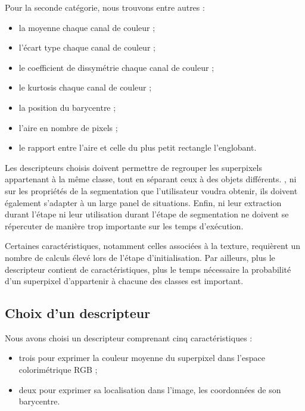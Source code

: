 Pour la seconde catégorie, nous trouvons\modif{,} entre autres :
\begin{itemize}
\item la moyenne  chaque canal de couleur  ; 
\item l'écart type  chaque canal de couleur  ;
\item le coefficient de dissymétrie   chaque canal de couleur ; 
\item le kurtosis  chaque canal de couleur  ; 
\item la position du barycentre ;
\item l'aire en nombre de pixels ;
\item le rapport entre l'aire  et celle du plus petit rectangle l'englobant. 
\end{itemize}

Les descripteurs choisis doivent permettre de regrouper les superpixels appartenant à la même classe, tout en séparant ceux  à des objets différents. , ni sur les propriétés de la segmentation que l'utilisateur voudra obtenir, ils doivent également s'adapter à un large panel de situations. Enfin, ni leur extraction durant l'étape ni leur utilisation durant l'étape de segmentation ne doivent se répercuter de manière trop importante sur les temps d'exécution. 

Certaines caractéristiques, notamment celles associées à la texture, requièrent un nombre de calculs élevé lors de l'étape d'initialisation. Par ailleurs, plus le descripteur contient de caractéristiques, plus le temps nécessaire  la probabilité d'un superpixel d'appartenir à chacune des classes est important. 

\subsection{Choix d'un descripteur}

Nous avons choisi un descripteur  comprenant cinq caractéristiques :
\begin{itemize}
\item trois pour exprimer la couleur moyenne du superpixel dans l'espace colorimétrique RGB ;
\item deux pour exprimer sa localisation dans l'image,  les coordonnées de son barycentre.
\end{itemize} 

